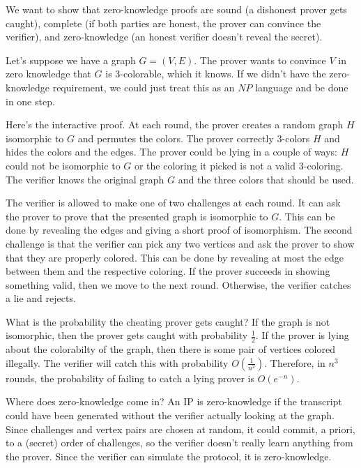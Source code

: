 \documentclass[twoside]{article}
\begin{document}
We want to show that zero-knowledge proofs are sound (a dishonest prover gets caught), complete (if both parties are honest, the prover can convince the verifier), and zero-knowledge (an honest verifier doesn't reveal the secret).  

Let's suppose we have a graph $G=(V,E)$.  The prover wants to convince $V$ in zero knowledge that $G$ is 3-colorable, which it knows.  If we didn't have the zero-knowledge requirement, we could just treat this as an $NP$ language and be done in one step.

Here's the interactive proof.  At each round, the prover creates a random graph $H$ isomorphic to $G$ and permutes the colors.  The prover correctly 3-colors $H$ and hides the colors and the edges.  The prover could be lying in a couple of ways: $H$ could not be isomorphic to $G$ or the coloring it picked is not a valid 3-coloring.  The verifier knows the original graph $G$ and the three colors that should be used.

The verifier is allowed to make one of two challenges at each round.  It can ask the prover to prove that the presented graph is isomorphic to $G$.  This can be done by revealing the edges and giving a short proof of isomorphism.  The second challenge is that the verifier can pick any two vertices and ask the prover to show that they are properly colored.  This can be done by revealing at most the edge between them and the respective coloring.  If the prover succeeds in showing something valid, then we move to the next round.  Otherwise, the verifier catches a lie and rejects.

What is the probability the cheating prover gets caught?  If the graph is not isomorphic, then the prover gets caught with probability $\frac{1}{2}$.  If the prover is lying about the colorabilty of the graph, then there is some pair of vertices colored illegally.  The verifier will catch this with probability $O(\frac{1}{n^2})$.  Therefore, in $n^3$ rounds, the probability of failing to catch a lying prover is $O(e^{-n})$.

Where does zero-knowledge come in?  An IP is zero-knowledge if the transcript could have been generated without the verifier actually looking at the graph.  Since challenges and vertex pairs are chosen at random, it could commit, a priori, to a (secret) order of challenges, so the verifier doesn't really learn anything from the prover.  Since the verifier can simulate the protocol, it is zero-knowledge.
\end{document}
